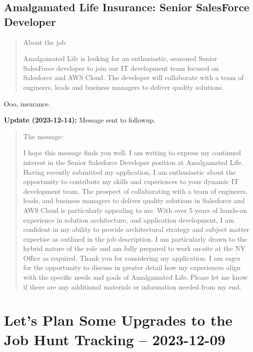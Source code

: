 \documentclass[
	letterpaper, %
	12pt, %
]{CSSullivanBusinessReport}
\begin{document}

\subsection[Amalgamated Life Insurance]{Amalgamated Life Insurance: Senior SalesForce Developer}

\begin{quote}
	About the job
	
	Amalgamated Life is looking for an enthusiastic, seasoned Senior SalesForce developer to join our IT development team focused on Salesforce and AWS Cloud. The developer will collaborate with a team of engineers, leads and business managers to deliver quality solutions.

\end{quote}

Ooo, insurance.

\textbf{Update (2023-12-14):} Message sent to followup.

\begin{quote}
	The message:
	
	I hope this message finds you well. I am writing to express my continued interest in the Senior Salesforce Developer position at Amalgamated Life. Having recently submitted my application, I am enthusiastic about the opportunity to contribute my skills and experiences to your dynamic IT development team. The prospect of collaborating with a team of engineers, leads, and business managers to deliver quality solutions in Salesforce and AWS Cloud is particularly appealing to me. With over 5 years of hands-on experience in solution architecture, and application development, I am confident in my ability to provide architectural strategy and subject matter expertise as outlined in the job description. I am particularly drawn to the hybrid nature of the role and am fully prepared to work on-site at the NY Office as required. Thank you for considering my application. I am eager for the opportunity to discuss in greater detail how my experiences align with the specific needs and goals of Amalgamated Life. Please let me know if there are any additional materials or information needed from my end. 

\end{quote}


\section[9 Dec: Workflow Idea]{Let's Plan Some Upgrades to the Job Hunt Tracking -- 2023-12-09} %
\end{document}
